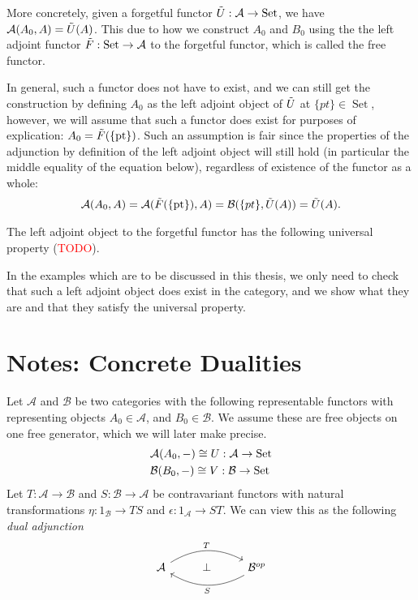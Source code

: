 \documentclass[12pt,a4paper]{article}
\DeclareMathOperator{\Set}{Set}
\def\HomA{\ensuremath\mathcal{A}}
\def\HomB{\ensuremath\mathcal{B}}
\def\t{\ensuremath\tilde}
\begin{document}
More concretely, given a forgetful functor $\t U: \mathcal{A} \to \Set$, we have $\HomA(A_0,A) = \t U(A)$. This due to how we construct $A_0$ and $B_0$ using the the left adjoint functor $\t F: \Set \to \mathcal{A}$ to the forgetful functor, which is called the free functor. 

In general, such a functor does not have to exist, and we can still get the construction by defining $A_0$ as the left adjoint object of $\t U$ at $\{pt\} \in \Set$, however, we will assume that such a functor does exist for purposes of explication: $A_0 = \t F(\{\text{pt}\})$. Such an assumption is fair since the properties of the adjunction by definition of the left adjoint object will still hold (in particular the middle equality of the equation below), regardless of existence of the functor as a whole: \begin{align*}
	\HomA(A_0, A) = \HomA(\t F(\{\text{pt}\}), A) = \HomB(\{pt\}, \t U(A)) = \t U(A).
\end{align*}

The left adjoint object to the forgetful functor has the following universal property (\textcolor{red}{TODO}).

In the  examples which are to be discussed in this thesis, we only need to check that such a left adjoint object does exist in the category, and we show what they are and that they satisfy the universal property.
\section{Notes: Concrete Dualities}	

Let $\mathcal{A}$ and $\mathcal{B}$ be two categories with the following representable functors with representing objects $A_0 \in \mathcal{A}$, and $B_0 \in \mathcal{B}$. We assume these are free objects on one free generator, which we will later make precise. 
\begin{align*}
	&\HomA(A_0, -) \cong U: \mathcal{A} \to \Set\\
	&\HomB(B_0, -) \cong V: \mathcal{B} \to \Set\\
\end{align*}
Let $T: \mathcal{A} \to \mathcal{B}$ and $S: \mathcal{B} \to \mathcal{A}$ be contravariant functors with natural transformations $\eta: 1_\mathcal{B} \to TS$ and $\epsilon :  1_\mathcal{A} \to ST$. We can view this as the following \emph{dual adjunction}
\[\begin{tikzcd}
	{\mathcal{A}} & \bot & {\mathcal{B}^{op}}
	\arrow["T", bend left, from=1-1, to=1-3]
	\arrow["S", bend left, from=1-3, to=1-1]
\end{tikzcd}\]
\end{document}
